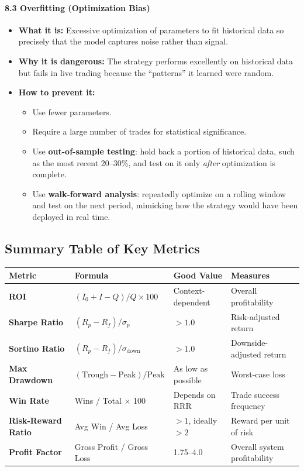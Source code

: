 \documentclass[12pt,openany]{book}
\begin{document}
\paragraph{8.3 Overfitting (Optimization Bias)}
\begin{itemize}[leftmargin=*]
    \item \textbf{What it is:} Excessive optimization of parameters to fit historical data so precisely that the model captures noise rather than signal.
    \item \textbf{Why it is dangerous:} The strategy performs excellently on historical data but fails in live trading because the ``patterns'' it learned were random.
    \item \textbf{How to prevent it:}
    \begin{itemize}[leftmargin=*]
        \item Use fewer parameters.
        \item Require a large number of trades for statistical significance.
        \item Use \textbf{out-of-sample testing}: hold back a portion of historical data, such as the most recent 20--30\%, and test on it only \emph{after} optimization is complete.
        \item Use \textbf{walk-forward analysis}: repeatedly optimize on a rolling window and test on the next period, mimicking how the strategy would have been deployed in real time.
    \end{itemize}
\end{itemize}

\subsection{Summary Table of Key Metrics}

\begin{center}
\small
\begin{tabular}{|L{0.18\textwidth}|L{0.30\textwidth}|L{0.18\textwidth}|L{0.22\textwidth}|}
\hline
\textbf{Metric} & \textbf{Formula} & \textbf{Good Value} & \textbf{Measures} \\
\hline
\textbf{ROI} & $(I_0 + I - Q)/Q \times 100$ & Context-dependent & Overall profitability \\
\hline
\textbf{Sharpe Ratio} & $(R_p - R_f)/\sigma_p$ & $> 1.0$ & Risk-adjusted return \\
\hline
\textbf{Sortino Ratio} & $(R_p - R_f)/\sigma_{\text{down}}$ & $> 1.0$ & Downside-adjusted return \\
\hline
\textbf{Max Drawdown} & $(\text{Trough} - \text{Peak})/\text{Peak}$ & As low as possible & Worst-case loss \\
\hline
\textbf{Win Rate} & Wins / Total $\times$ 100 & Depends on RRR & Trade success frequency \\
\hline
\textbf{Risk-Reward Ratio} & Avg Win / Avg Loss & $> 1$, ideally $> 2$ & Reward per unit of risk \\
\hline
\textbf{Profit Factor} & Gross Profit / Gross Loss & 1.75--4.0 & Overall system profitability \\
\hline
\end{tabular}
\end{center}
\end{document}
